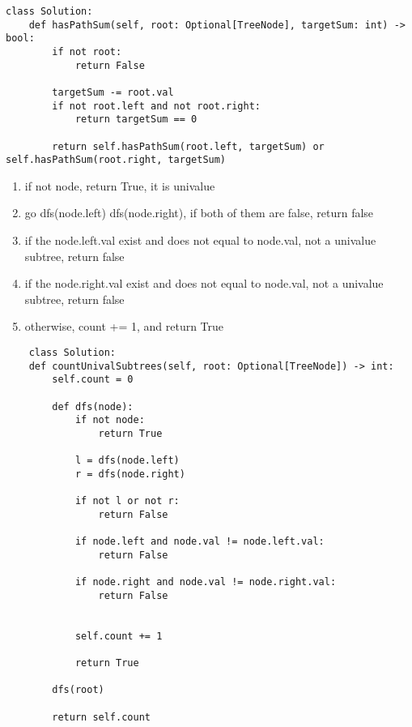 \documentclass{assignmeownt}
\begin{document}
\begin{lstlisting}[caption=path sum recursion]
    class Solution:
    def hasPathSum(self, root: Optional[TreeNode], targetSum: int) -> bool:
        if not root:
            return False
        
        targetSum -= root.val
        if not root.left and not root.right:
            return targetSum == 0

        return self.hasPathSum(root.left, targetSum) or self.hasPathSum(root.right, targetSum)

\end{lstlisting}


\begin{enumerate}
    \item if not node, return True, it is univalue
    \item go dfs(node.left) dfs(node.right), if both of them are false, return false
    \item if the node.left.val exist and does not equal to node.val, not a univalue subtree, return false
    \item if the node.right.val exist and does not equal to node.val, not a univalue subtree, return false
    \item otherwise, count += 1, and return True
\end{enumerate}

\begin{lstlisting}
    class Solution:
    def countUnivalSubtrees(self, root: Optional[TreeNode]) -> int:
        self.count = 0

        def dfs(node):
            if not node:
                return True

            l = dfs(node.left)
            r = dfs(node.right)
            
            if not l or not r:
                return False
            
            if node.left and node.val != node.left.val:
                return False
            
            if node.right and node.val != node.right.val:
                return False
            

            self.count += 1

            return True
        
        dfs(root)

        return self.count
\end{lstlisting}
\end{document}
